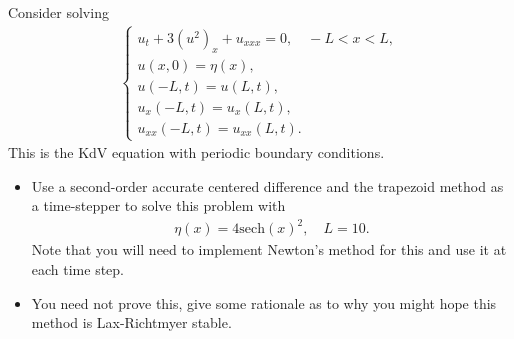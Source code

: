 \documentclass[12pt]{report}
\begin{document}
\newpage



\begin{problem}
    Consider solving
    \begin{align*}
        \begin{cases} u_t + 3 (u^2)_x + u_{xxx} = 0, \quad -L < x < L,\\
            u(x,0) = \eta(x),\\
            u(-L,t) = u(L,t),\\
            u_x(-L,t) = u_x(L,t),\\
            u_{xx}(-L,t) = u_{xx}(L,t).\end{cases}
        \end{align*}
        This is the KdV equation with periodic boundary conditions.
        \begin{itemize}
            \item Use a second-order accurate centered difference and the trapezoid method as a time-stepper to solve this problem with
            \begin{align*}
                \eta(x) = 4 \mathrm{sech}(x)^2, \quad L = 10.
            \end{align*}
      Note that you will need to implement Newton's method for this and use it at each time step.
    \item You need not prove this, give some rationale as to why you might hope this method is Lax-Richtmyer stable.  
\end{itemize}
\end{problem}
\end{document}
